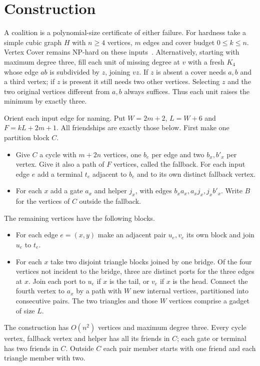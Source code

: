 \documentclass[11pt,a4paper]{amsart}
\begin{document}
\section{Construction}
A coalition is a polynomial-size certificate of either failure. For hardness take a simple cubic graph $H$ with $n\ge4$ vertices, $m$ edges and cover budget $0\le k\le n$. Vertex Cover remains NP-hard on these inputs~\cite{ak}. Alternatively, starting with maximum degree three, fill each unit of missing degree at $v$ with a fresh $K_4$ whose edge $ab$ is subdivided by $z$, joining $vz$. If $z$ is absent a cover needs $a,b$ and a third vertex; if $z$ is present it still needs two other vertices. Selecting $z$ and the two original vertices different from $a,b$ always suffices. Thus each unit raises the minimum by exactly three.

Orient each input edge for naming. Put $W=2m+2$, $L=W+6$ and $F=kL+2m+1$. All friendships are exactly those below. First make one partition block $C$.
\begin{itemize}
\item Give $C$ a cycle with $m+2n$ vertices, one $b_e$ per edge and two $b_x,b'_x$ per vertex. Give it also a path of $F$ vertices, called the fallback. For each input edge $e$ add a terminal $t_e$ adjacent to $b_e$ and to its own distinct fallback vertex.
\item For each $x$ add a gate $a_x$ and helper $j_x$, with edges $b_xa_x,a_xj_x,j_xb'_x$. Write $B$ for the vertices of $C$ outside the fallback.
\end{itemize}
The remaining vertices have the following blocks.
\begin{itemize}
\item For each edge $e=(x,y)$ make an adjacent pair $u_e,v_e$ its own block and join $u_e$ to $t_e$.
\item For each $x$ take two disjoint triangle blocks joined by one bridge. Of the four vertices not incident to the bridge, three are distinct ports for the three edges at $x$. Join each port to $u_e$ if $x$ is the tail, or $v_e$ if $x$ is the head. Connect the fourth vertex to $a_x$ by a path with $W$ new internal vertices, partitioned into consecutive pairs. The two triangles and those $W$ vertices comprise a gadget of size $L$.
\end{itemize}
The construction has $O(n^2)$ vertices and maximum degree three. Every cycle vertex, fallback vertex and helper has all its friends in $C$; each gate or terminal has two friends in $C$. Outside $C$ each pair member starts with one friend and each triangle member with two.
\end{document}
